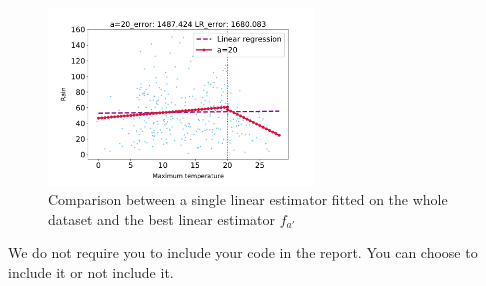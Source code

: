 \documentclass[12pt,twoside]{article}
\begin{document}
\begin{enumerate}
\begin{enumerate}
 	\begin{figure}[H]
		\centering
		\includegraphics[width=200pt]{figures/test_comparison.pdf}
		\caption{Comparison between a single linear estimator fitted on the whole dataset and the best linear estimator $f_{a'}$}
		\label{fig7}
	\end{figure}


 \end{enumerate}
 	
 We do not require you to include your code in the report. You can choose to include it or not include it. 
\end{enumerate}
\end{document}
